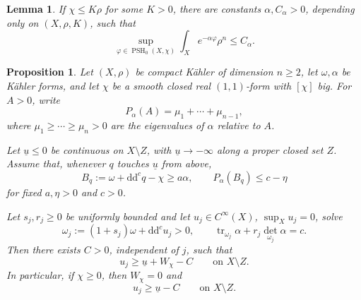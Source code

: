 \documentclass[10pt,a4paper]{amsart}
\newtheorem{prop}{Proposition}
\newtheorem{lem}{Lemma}
\renewcommand{\d}{\mathrm{d}}
\newcommand{\ddc}{\d\d^c}
\def\tr{\operatorname{tr}}
\begin{document}
\begin{lem}
	\label{lem:uniform-alpha-integrability}
	If $\chi\leq K\rho$ for some $K>0$, there are constants
	$\alpha,C_\alpha>0$, depending only on $(X,\rho,K)$, such that
	\begin{equation}
		\label{eq:uniform-alpha-integrability}
		\sup_{\varphi\in\operatorname{PSH}_0(X,\chi)}
		\int_Xe^{-\alpha\varphi}\rho^n\leq C_\alpha.
	\end{equation}
\end{lem}

\begin{prop}
\label{prop:J-relative}
Let $(X,\rho)$ be compact K\"ahler of dimension $n\geq 2$, let
$\omega,\alpha$ be K\"ahler forms, and let $\chi$ be a smooth closed real
$(1,1)$-form with $[\chi]$ big. For $A>0$, write
$$
P_\alpha(A)=\mu_1+\cdots+\mu_{n-1},
$$
where $\mu_1\geq\cdots\geq\mu_n>0$ are the eigenvalues of $\alpha$
relative to $A$.

Let $\underline u\leq 0$ be continuous on $X\setminus Z$, with
$\underline u\to-\infty$ along a proper closed set $Z$. Assume that,
whenever $q$ touches $\underline u$ from above,
$$
B_q:=\omega+\ddc q-\chi\geq a\alpha,
\qquad
P_\alpha(B_q)\leq c-\eta
$$
for fixed $a,\eta>0$ and $c>0$.

Let $s_j,r_j\geq 0$ be uniformly bounded and let
$u_j\in C^\infty(X)$, $\sup_Xu_j=0$, solve
$$
\omega_j:=(1+s_j)\omega+\ddc u_j>0,
\qquad
\tr_{\omega_j}\alpha+r_j\det_{\omega_j}\alpha=c.
$$
Then there exists $C>0$, independent of $j$, such that
$$
u_j\geq \underline u+W_\chi-C
\qquad\text{on }X\setminus Z.
$$
In particular, if $\chi\geq 0$, then $W_\chi=0$ and
$$
u_j\geq \underline u-C
\qquad\text{on }X\setminus Z.
$$
\end{prop}
\end{document}

